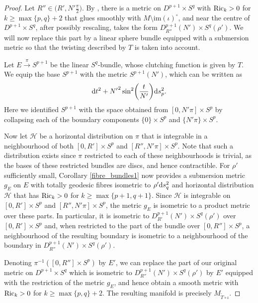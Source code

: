 \begin{proof}
	Let $R''\in\bigl(R',N'\frac{\pi}{2}\bigr)$. By \cite[Theorem C and Remark 4.2]{RW}, there is a metric on $D^{p+1}\times S^q$ with ${\rm Ric}_k>0$ for $k\geq\max\{p,q\}+2$ that glues smoothly with $M\setminus\mathrm{im}(\iota)^\circ$, and near the centre of~${D^{p+1}\times S^q}$, after possibly rescaling, takes the form $D^{p+1}_{R''}(N')\times S^q(\rho')$. We will now replace this part by a linear sphere bundle equipped with a submersion metric so that the twisting described by $T$ is taken into account.
	
	Let $E\xrightarrow{\pi}S^{p+1}$ be the linear $S^q$-bundle, whose clutching function is given by $T$. We equip the base $S^{p+1}$ with the metric $S^{p+1}(N')$, which can be written as
	\[{\rm d}t^2+{N'}^2\sin^2\biggl(\frac{t}{N'} \biggr){\rm d}s_p^2. \]	
	Here we identified $S^{p+1}$ with the space obtained from $[0,N'\pi]\times S^p$ by collapsing each of the boundary components $\{0 \}\times S^p$ and $\{N'\pi \}\times S^p$.
	
	Now let $\mathcal{H}$ be a horizontal distribution on $\pi$ that is integrable in a neighbourhood of both $[0,R']\times S^p$ and $[R'',N'\pi]\times S^p$. Note that such a distribution exists since $\pi$ restricted to each of these neighbourhoods is trivial, as the bases of these restricted bundles are discs, and hence contractible. For $\rho'$ sufficiently small, Corollary \ref{fibre_bundles1} now provides a submersion metric $g_E$ on $E$ with totally geodesic fibres isometric to $\rho'{\rm d}s_q^2$ and horizontal distribution $\mathcal{H}$ that has ${\rm Ric}_k>0$ for $k\geq\max\{p+1,q+1 \}$. Since $\mathcal{H}$ is integrable on $[0,R']\times S^p$ and $[R'',N'\pi]\times S^p$, the metric $g_E$ is isometric to a product metric over these parts. In particular, it is isometric to $D^{p+1}_{R'}(N')\times S^q(\rho')$ over $[0,R']\times S^p$ and, when restricted to the part of the bundle over $[0,R'']\times S^p$, a neighbourhood of the resulting boundary is isometric to a neighbourhood of the boundary in $D^{p+1}_{R''}(N')\times S^q(\rho')$.
	
Denoting $\pi^{-1}([0,R'']\times S^p)$ by $E'$, we can replace the part of our original metric on $D^{p+1}\times S^q$ which is isometric to $D^{p+1}_{R''}(N')\times S^q(\rho')$ by $E'$ equipped with the restriction of the metric $g_E$, and hence obtain a smooth metric with ${\rm Ric}_k>0$ for $k\geq \max\{p,q\}+2$. The resulting manifold is precisely $M_{\tilde{T}\circ \iota}$.
\end{proof}
